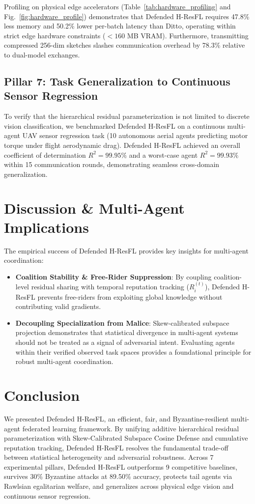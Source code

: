 \documentclass[sigconf]{acmart}
\begin{document}
Profiling on physical edge accelerators (Table~\ref{tab:hardware_profiling} and Fig.~\ref{fig:hardware_profile}) demonstrates that Defended H-ResFL requires 47.8\% less memory and 50.2\% lower per-batch latency than Ditto, operating within strict edge hardware constraints ($<160$ MB VRAM). Furthermore, transmitting compressed 256-dim sketches slashes communication overhead by 78.3\% relative to dual-model exchanges.

\subsection{Pillar 7: Task Generalization to Continuous Sensor Regression}
To verify that the hierarchical residual parameterization is not limited to discrete vision classification, we benchmarked Defended H-ResFL on a continuous multi-agent UAV sensor regression task (10 autonomous aerial agents predicting motor torque under flight aerodynamic drag). Defended H-ResFL achieved an overall coefficient of determination $R^2 = \mathbf{99.95\%}$ and a worst-case agent $R^2 = \mathbf{99.93\%}$ within 15 communication rounds, demonstrating seamless cross-domain generalization.

\section{Discussion & Multi-Agent Implications}
The empirical success of Defended H-ResFL provides key insights for multi-agent coordination:
\begin{itemize}
    \item \textbf{Coalition Stability & Free-Rider Suppression}: By coupling coalition-level residual sharing with temporal reputation tracking ($R_i^{(t)}$), Defended H-ResFL prevents free-riders from exploiting global knowledge without contributing valid gradients.
    \item \textbf{Decoupling Specialization from Malice}: Skew-calibrated subspace projection demonstrates that statistical divergence in multi-agent systems should not be treated as a signal of adversarial intent. Evaluating agents within their verified observed task spaces provides a foundational principle for robust multi-agent coordination.
\end{itemize}

\section{Conclusion}
We presented Defended H-ResFL, an efficient, fair, and Byzantine-resilient multi-agent federated learning framework. By unifying additive hierarchical residual parameterization with Skew-Calibrated Subspace Cosine Defense and cumulative reputation tracking, Defended H-ResFL resolves the fundamental trade-off between statistical heterogeneity and adversarial robustness. Across 7 experimental pillars, Defended H-ResFL outperforms 9 competitive baselines, survives 30\% Byzantine attacks at 89.50\% accuracy, protects tail agents via Rawlsian egalitarian welfare, and generalizes across physical edge vision and continuous sensor regression.
\end{document}
